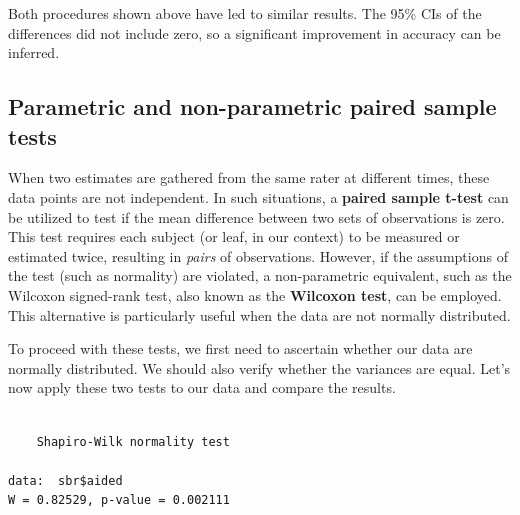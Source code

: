 \documentclass[
  letterpaper,
]{book}
\newenvironment{Shaded}{\begin{snugshade}}{\end{snugshade}}
\newcommand{\CommentTok}[1]{\textcolor[rgb]{0.37,0.37,0.37}{#1}}
\newcommand{\FunctionTok}[1]{\textcolor[rgb]{0.28,0.35,0.67}{#1}}
\newcommand{\NormalTok}[1]{\textcolor[rgb]{0.00,0.23,0.31}{#1}}
\newcommand{\SpecialCharTok}[1]{\textcolor[rgb]{0.37,0.37,0.37}{#1}}
\begin{document}
Both procedures shown above have led to similar results. The 95\% CIs of
the differences did not include zero, so a significant improvement in
accuracy can be inferred.

\hypertarget{parametric-and-non-parametric-paired-sample-tests}{%
\subsection{Parametric and non-parametric paired sample
tests}\label{parametric-and-non-parametric-paired-sample-tests}}

When two estimates are gathered from the same rater at different times,
these data points are not independent. In such situations, a
\textbf{paired sample t-test} can be utilized to test if the mean
difference between two sets of observations is zero. This test requires
each subject (or leaf, in our context) to be measured or estimated
twice, resulting in \emph{pairs} of observations. However, if the
assumptions of the test (such as normality) are violated, a
non-parametric equivalent, such as the Wilcoxon signed-rank test, also
known as the \textbf{Wilcoxon test}, can be employed. This alternative
is particularly useful when the data are not normally distributed.

To proceed with these tests, we first need to ascertain whether our data
are normally distributed. We should also verify whether the variances
are equal. Let's now apply these two tests to our data and compare the
results.

\begin{Shaded}
\end{Shaded}

\begin{verbatim}

    Shapiro-Wilk normality test

data:  sbr$aided
W = 0.82529, p-value = 0.002111
\end{verbatim}

\begin{Shaded}
\end{Shaded}
\end{document}
